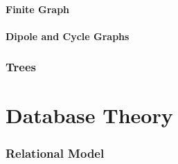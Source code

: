 \documentclass{article}
\begin{document}
\subsection{Finite Graph} \label{subsec:finite_graph}

\subsection{Dipole and Cycle Graphs} \label{subsec:dipole_cycle_graph}



\section{Trees} \label{sec:trees}







\part{Database Theory}\label{sec:database_theory}



\section{Relational Model}\label{sec:relational_model}
\end{document}
